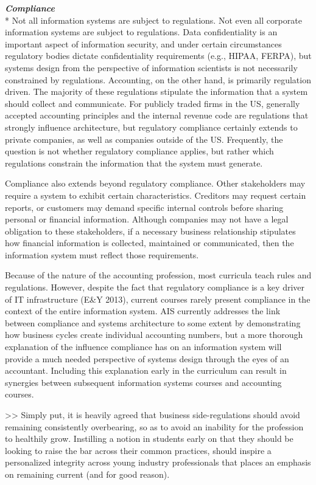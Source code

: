 \documentclass[12pt]{article}
\newcommand{\SubSubSection}[1]{{\centering{}\normalsize{}\textbf{\emph{#1}}}\\*\indent{}}
\begin{document}
\SubSubSection{Compliance}
Not all information systems are subject to regulations. Not even all corporate information systems are subject to regulations. Data confidentiality is an important aspect of information security, and under certain circumstances regulatory bodies dictate confidentiality requirements (e.g., HIPAA, FERPA), but systems design from the perspective of information scientists is not necessarily constrained by regulations. Accounting, on the other hand, is primarily regulation driven. The majority of these regulations stipulate the information that a system should collect and communicate. For publicly traded firms in the US, generally accepted accounting principles and the internal revenue code are regulations that strongly influence architecture, but regulatory compliance certainly extends to private companies, as well as companies outside of the US. Frequently, the question is not whether regulatory compliance applies, but rather which regulations constrain the information that the system must generate.

Compliance also extends beyond regulatory compliance. Other stakeholders may require a system to exhibit certain characteristics. Creditors may request certain reports, or customers may demand specific internal controls before sharing personal or financial information. Although companies may not have a legal obligation to these stakeholders, if a necessary business relationship stipulates how financial information is collected, maintained or communicated, then the information system must reflect those requirements.

Because of the nature of the accounting profession, most curricula teach rules and regulations. However, despite the fact that regulatory compliance is a key driver of IT infrastructure (E\&Y 2013), current courses rarely present compliance in the context of the entire information system. AIS currently addresses the link between compliance and systems architecture to some extent by demonstrating how business cycles create individual accounting numbers, but a more thorough explanation of the influence compliance has on an information system will provide a much needed perspective of systems design through the eyes of an accountant. Including this explanation early in the curriculum can result in synergies between subsequent information systems courses and accounting courses.

>> Simply put, it is heavily agreed that business side-regulations should avoid remaining consistently overbearing, so as to avoid an inability for the profession to healthily grow. Instilling a notion in students early on that they should be looking to raise the bar across their common practices, should inspire a personalized integrity across young industry professionals that places an emphasis on remaining current (and for good reason).
\end{document}
